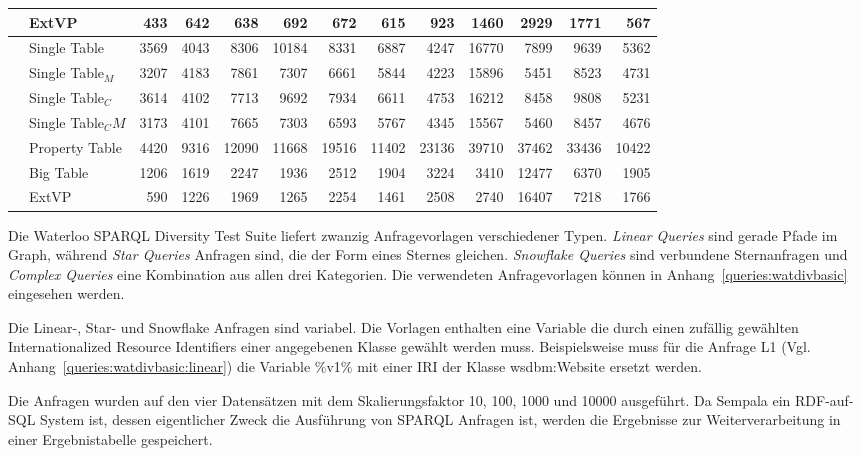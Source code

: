 \documentclass[
  a4paper,
  12pt,
  oneside,
  parskip=half,
  headsepline,
]{scrartcl}
\begin{document}
\begin{table*}[htb]
\begin{tabular*}{\textwidth}{ ll @{\extracolsep{\fill}} rrrrrrrrrrr }
		& ExtVP & 433 & 642 & 638 & 692 & 672 & 615 & 923 & 1460 & 2929 & 1771 & 567 \\
		\midrule
		\multirow{7}{*}{\rotatebox{90}{SF10000}}
		& Single Table & 3569 & 4043 & 8306 & 10184 & 8331 & 6887 & 4247 & 16770 & 7899 & 9639 & 5362 \\
		& Single Table$_M$ & 3207 & 4183 & 7861 & 7307 & 6661 & 5844 & 4223 & 15896 & 5451 & 8523 & 4731 \\
		& Single Table$_C$ & 3614 & 4102 & 7713 & 9692 & 7934 & 6611 & 4753 & 16212 & 8458 & 9808 & 5231 \\
		& Single Table$_CM$ & 3173 & 4101 & 7665 & 7303 & 6593 & 5767 & 4345 & 15567 & 5460 & 8457 & 4676 \\
		& Property Table & 4420 & 9316 & 12090 & 11668 & 19516 & 11402 & 23136 & 39710 & 37462 & 33436 & 10422 \\
		& Big Table & 1206 & 1619 & 2247 & 1936 & 2512 & 1904 & 3224 & 3410 & 12477 & 6370 & 1905 \\
		& ExtVP & 590 & 1226 & 1969 & 1265 & 2254 & 1461 & 2508 & 2740 & 16407 & 7218 & 1766 \\
		 \bottomrule
  	\end{tabular*}
\end{table*}

Die Waterloo SPARQL Diversity Test Suite liefert zwanzig Anfragevorlagen
verschiedener Typen. \textit{Linear Queries} sind gerade Pfade im Graph, während
\textit{Star Queries} Anfragen sind, die der Form eines Sternes gleichen.
\textit{Snowflake Queries} sind verbundene Sternanfragen und \textit{Complex
Queries} eine Kombination aus allen drei Kategorien. Die verwendeten
Anfragevorlagen können in Anhang~\ref{queries:watdivbasic} eingesehen werden.

Die Linear-, Star- und Snowflake Anfragen sind variabel. Die Vorlagen enthalten
eine Variable die durch einen zufällig gewählten Internationalized Resource
Identifiers einer angegebenen Klasse gewählt werden muss. Beispielsweise muss
für die Anfrage L1 (Vgl. Anhang~\ref{queries:watdivbasic:linear}) die Variable
\%v1\% mit einer IRI der Klasse wsdbm:Website ersetzt werden.

Die Anfragen wurden auf den vier Datensätzen mit dem Skalierungsfaktor 10, 100,
1000 und 10000 ausgeführt. Da Sempala ein RDF-auf-SQL System ist, dessen
eigentlicher Zweck die Ausführung von SPARQL Anfragen ist, werden die Ergebnisse
zur Weiterverarbeitung in einer Ergebnistabelle gespeichert.
\end{document}
